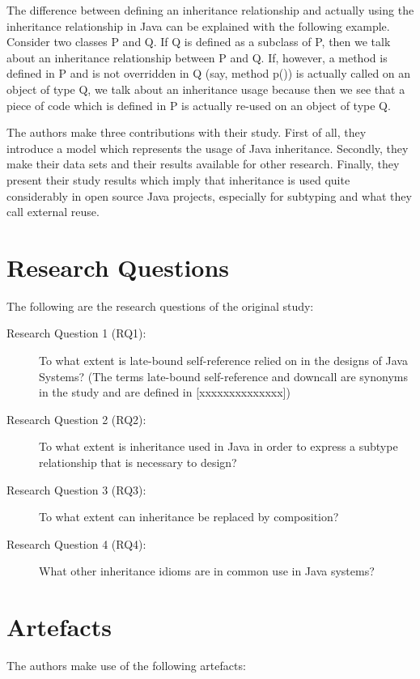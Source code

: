 \documentclass{uvamscse}
\begin{document}
The difference between defining an inheritance relationship and actually using the inheritance relationship in Java can be explained with the following example. Consider two classes P and Q. If Q is defined as a subclass of P, then we talk about an inheritance relationship between P and Q. If, however, a method is defined in P and is not overridden in Q (say, method p()) is actually called on an object of type Q, we talk about an inheritance usage because then we see that a piece of code which is defined in P is actually re-used on an object of type Q.

The authors make three contributions with their study. First of all, they introduce a model which represents the usage of Java inheritance. Secondly, they make their data sets and their results available for other research. Finally, they present their study results which imply that inheritance is used quite considerably in open source Java projects, especially for subtyping and what they call external reuse. 


\section{Research Questions}

The following are the research questions of the original study:

\begin{description}
\item [Research Question 1 (RQ1):] To what extent is late-bound self-reference relied on in the designs of Java Systems? (The terms late-bound self-reference and downcall are synonyms in the study and are defined in [xxxxxxxxxxxxxx])

\item [Research Question 2 (RQ2):] To what extent is inheritance used in Java in order to express a subtype relationship that is necessary to design?

\item[Research Question 3 (RQ3):] To what extent can inheritance be replaced by composition?

\item[Research Question 4 (RQ4):] What other inheritance idioms are in common use in Java systems? 
\end{description}





\section{Artefacts}
The authors make use of the following artefacts:
\end{document}
